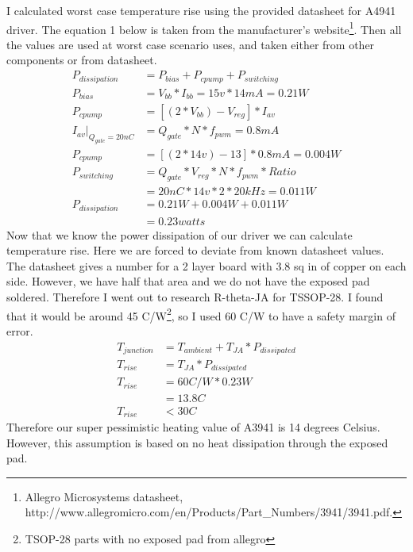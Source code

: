 \documentclass[12pt]{article}
\begin{document}
I calculated worst case temperature rise using the provided datasheet for A4941 driver. The equation 1 below is taken from the manufacturer's website\footnote{Allegro Microsystems datasheet, http://www.allegromicro.com/en/Products/Part\_Numbers/3941/3941.pdf.}. Then all the values are used at worst case scenario uses, and taken either from other components or from datasheet. 
\begin{align}
P_{dissipation} &= P_{bias} + P_{cpump} + P_{switching} 
\\ P_{bias} &= V_{bb} * I_{bb} = 15 v * 14 mA = 0.21 W
\\ P_{cpump} &=[(2 * V_{bb})-V_{reg}] * I_{av}  
\\ I_{av}|_{Q_{gate}=20 nC} &= Q_{gate} * N  * f_{pwm} = 0.8 mA
\\ P_{cpump} &= [(2 * 14 v) - 13] * 0.8 mA = 0.004 W
\\
P_{switching} &=Q_{gate} * V_{reg} * N * f_{pwm} * Ratio \\
    &= 20 nC * 14 v * 2 * 20 kHz = 0.011 W
 \\ P_{dissipation} &= 0.21 W + 0.004 W + 0.011 W 
 \\ &=0.23 watts
\end{align} 
Now that we know the power dissipation of our driver we can calculate temperature rise. Here we are forced to deviate from known datasheet values. The datasheet gives a number for a 2 layer board with 3.8 sq in of copper on each side. However, we have half that area and we do not have the exposed pad soldered. Therefore I went out to research R-theta-JA for TSSOP-28. I found that it would be around 45 C/W\footnote{TSOP-28 parts with no exposed pad from allegro}, so I used 60 C/W to have a safety margin of error.
\begin{align}
T_{junction} &= T_{ambient} + T_{JA} * P_{dissipated}
\\T_{rise} &= T_{JA} * P_{dissipated}
\\T_{rise} &= 60 C/W * 0.23 W
\\&=13.8 C
\\T_{rise}&<30 C
\end{align}
Therefore our super pessimistic heating value of A3941 is 14 degrees Celsius. However, this assumption is based on no heat dissipation through the exposed pad. 
\end{document}
